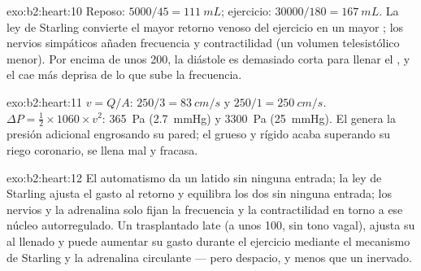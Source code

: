 \begin{solution}{exo:b2:heart:10}
Reposo: $5000/45 = \qty{111}{mL}$; ejercicio: $\num{30000}/180 =
\qty{167}{mL}$. La ley de Starling convierte el mayor retorno venoso del
ejercicio en un mayor ; los nervios simpáticos añaden
frecuencia y contractilidad (un volumen telesistólico menor). Por encima
de unos 200, la diástole es demasiado corta para llenar el , y el
 cae más deprisa de lo que sube la frecuencia.
\end{solution}

\begin{solution}{exo:b2:heart:11}
$v = Q/A$: $250/3 = \qty{83}{cm/s}$ y $250/1 = \qty{250}{cm/s}$.
$\Delta P = \tfrac12\times 1060\times v^{2}$: \qty{365}{Pa}
(\qty{2.7}{mmHg}) y \qty{3300}{Pa} (\qty{25}{mmHg}). El  genera
la presión adicional engrosando su pared; el  grueso y rígido
acaba superando su riego coronario, se llena mal y fracasa.
\end{solution}

\begin{solution}{exo:b2:heart:12}
El automatismo da un latido sin ninguna entrada; la ley de Starling ajusta
el gasto al retorno y equilibra los dos  sin ninguna entrada;
los nervios y la adrenalina solo fijan la frecuencia y la contractilidad
en torno a ese núcleo autorregulado. Un  trasplantado late (a unos
100, sin tono vagal), ajusta su  al llenado y puede
aumentar su gasto durante el ejercicio mediante el mecanismo de Starling y
la adrenalina circulante --- pero despacio, y menos que un 
inervado.
\end{solution}

